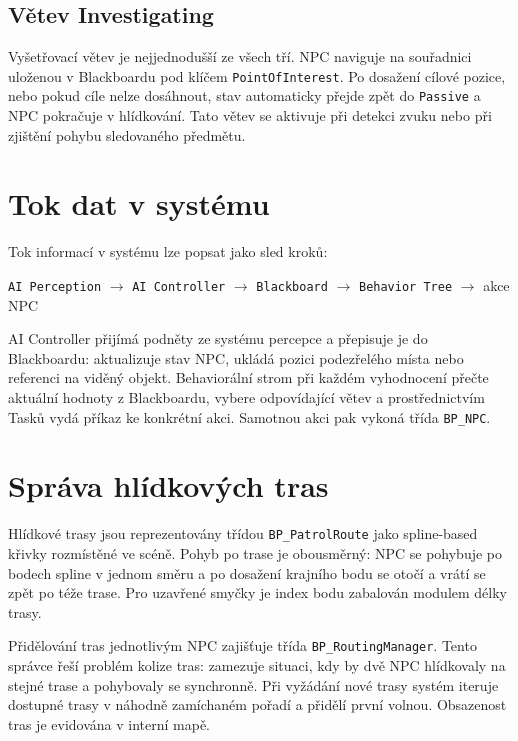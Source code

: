 \subsection{Větev Investigating}

Vyšetřovací větev je nejjednodušší ze všech tří. NPC naviguje na souřadnici uloženou v Blackboardu pod klíčem \texttt{PointOfInterest}. 
Po dosažení cílové pozice, nebo pokud cíle nelze dosáhnout, stav automaticky přejde zpět do \texttt{Passive} a NPC pokračuje v hlídkování. 
Tato větev se aktivuje při detekci zvuku nebo při zjištění pohybu sledovaného předmětu.

\section{Tok dat v systému}

Tok informací v systému lze popsat jako sled kroků:

\begin{center}
\texttt{AI Perception} $\rightarrow$ \texttt{AI Controller} $\rightarrow$ \texttt{Blackboard} $\rightarrow$ \texttt{Behavior Tree} $\rightarrow$ akce NPC
\end{center}

AI Controller přijímá podněty ze systému percepce a přepisuje je do Blackboardu: aktualizuje stav NPC, ukládá pozici podezřelého místa nebo referenci na viděný objekt. Behaviorální strom při každém vyhodnocení přečte aktuální hodnoty z Blackboardu, vybere odpovídající větev a prostřednictvím Tasků vydá příkaz ke konkrétní akci. Samotnou akci pak vykoná třída \texttt{BP\_NPC}.

\section{Správa hlídkových tras}

Hlídkové trasy jsou reprezentovány třídou \texttt{BP\_PatrolRoute} jako spline-based křivky rozmístěné ve scéně. 
Pohyb po trase je obousměrný: NPC se pohybuje po bodech spline v jednom směru a po dosažení krajního bodu se otočí a vrátí se zpět po téže trase. 
Pro uzavřené smyčky je index bodu zabalován modulem délky trasy.

Přidělování tras jednotlivým NPC zajišťuje třída \texttt{BP\_RoutingManager}. 
Tento správce řeší problém kolize tras: zamezuje situaci, kdy by dvě NPC hlídkovaly na stejné trase a pohybovaly se synchronně. 
Při vyžádání nové trasy systém iteruje dostupné trasy v náhodně zamíchaném pořadí a přidělí první volnou. 
Obsazenost tras je evidována v interní mapě.

